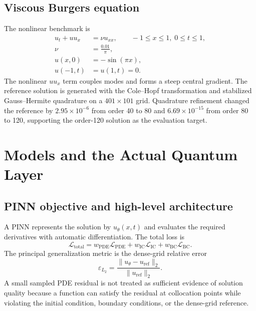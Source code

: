 \documentclass[10pt,a4paper]{article}
\begin{document}
\subsection{Viscous Burgers equation}

The nonlinear benchmark is
\begin{align}
 u_t+uu_x &= \nu u_{xx}, \qquad -1\le x\le1,\;0\le t\le1,\\
 \nu&=\frac{0.01}{\pi},\\
 u(x,0)&=-\sin(\pi x),\\
 u(-1,t)&=u(1,t)=0.
\end{align}
The nonlinear $uu_x$ term couples modes and forms a steep central gradient. The reference solution is generated with the Cole--Hopf transformation \cite{cole1951,hopf1950} and stabilized Gauss--Hermite quadrature on a $401\times101$ grid. Quadrature refinement changed the reference by $2.95\times10^{-6}$ from order 40 to 80 and $6.69\times10^{-15}$ from order 80 to 120, supporting the order-120 solution as the evaluation target.

\section{Models and the Actual Quantum Layer}

\subsection{PINN objective and high-level architecture}

A PINN represents the solution by $u_\theta(x,t)$ and evaluates the required derivatives with automatic differentiation. The total loss is
\begin{equation}
\mathcal{L}_{\mathrm{total}}
=w_{\mathrm{PDE}}\mathcal{L}_{\mathrm{PDE}}
+w_{\mathrm{IC}}\mathcal{L}_{\mathrm{IC}}
+w_{\mathrm{BC}}\mathcal{L}_{\mathrm{BC}}.
\end{equation}
The principal generalization metric is the dense-grid relative error
\begin{equation}
\varepsilon_{L_2}
=\frac{\|u_\theta-u_{\mathrm{ref}}\|_2}{\|u_{\mathrm{ref}}\|_2}.
\end{equation}
A small sampled PDE residual is not treated as sufficient evidence of solution quality because a function can satisfy the residual at collocation points while violating the initial condition, boundary conditions, or the dense-grid reference.
\end{document}
